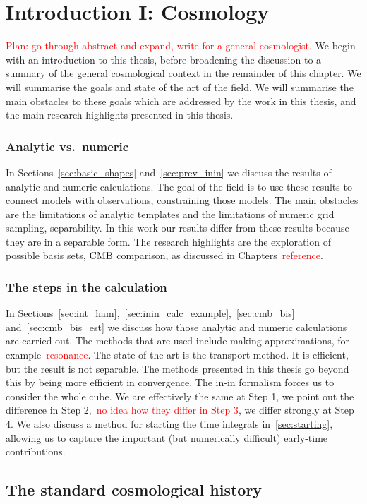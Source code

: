 %
\chapter{Introduction I: Cosmology}\label{chapter:intro_general}
\textcolor{red}{Plan: go through abstract and expand, write for a general cosmologist.}
We begin with an introduction to this thesis, before broadening the discussion
to a summary of the general cosmological context in the remainder of this chapter.
We will summarise the goals and state of the art of the field. We will summarise
the main obstacles to these goals which are addressed by the work in this thesis,
and the main research highlights presented in this thesis.
\subsection{Analytic vs.\ numeric}
In Sections~\ref{sec:basic_shapes} and~\ref{sec:prev_inin} we discuss the results of
analytic and numeric calculations.
The goal of the field is to use these results to connect models with observations,
constraining those models. The main obstacles are the limitations of analytic templates
and the limitations of numeric grid sampling, separability. In this work our results
differ from these results because they are in a separable form. The research highlights
are the exploration of possible basis sets,
$\text{CMB}$ comparison, as discussed in Chapters~\textcolor{red}{reference}.
\subsection{The steps in the calculation}
In Sections~\ref{sec:int_ham},~\ref{sec:inin_calc_example},~\ref{sec:cmb_bis} and~\ref{sec:cmb_bis_est}
we discuss how those analytic and numeric calculations are carried out. The methods that are used
include making approximations, for example~\textcolor{red}{resonance}. The state of the art is the
transport method. It is efficient, but the result is not separable. The methods presented in this
thesis go beyond this by being more efficient in convergence.
The in-in formalism forces us to consider the whole cube.
We are effectively the same at Step 1, we point out the difference in Step 2,~\textcolor{red}{no idea
how they differ in Step 3}, we differ strongly at Step 4.
We also discuss a method for starting the time integrals in~\ref{sec:starting},
allowing us to capture the important (but numerically difficult) early-time contributions.


\section{The standard cosmological history}\label{sec:general_intro}
